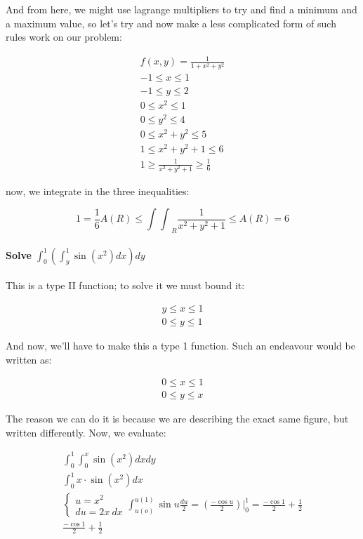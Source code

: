 \documentclass[11pt,fleqn]{book} %
\begin{document}
And from here, we might use lagrange multipliers to try and find a minimum and a maximum value, so let's try and now make a less complicated form of such rules work on our problem:

\begin{gather}
    f(x,y) = \frac{1}{1+x^2+y^2}\\
    -1 \leq x \leq 1 \\
    -1 \leq y \leq 2 \\
    0 \leq x^2 \leq 1 \\
    0 \leq y^2 \leq 4 \\
    0 \leq x^2 + y^2 \leq 5 \\
    1 \leq x^2 + y^2 + 1 \leq 6 \\
    1 \geq \frac{1}{x^2 + y^2 + 1} \geq \frac{1}{6}
\end{gather}

now, we integrate in the three inequalities:

\begin{equation}
    1 = \frac{1}{6} A(R) \leq {\int\int}_R \frac{1}{x^2+y^2+1} \leq A(R) = 6
\end{equation}

\paragraph*{Solve $\int_0^1(\int_y^1 \sin(x^2)dx)dy$}

This is a type II function; to solve it we must bound it:

\begin{gather}
    y \leq x \leq 1 \\
    0 \leq y \leq 1
\end{gather}

And now, we'll have to make this a type 1 function. Such an endeavour would be written as:

\begin{gather}
    0 \leq x \leq 1 \\
    0 \leq y \leq x
\end{gather}

The reason we can do it is because we are describing the exact same figure, but written differently. Now, we evaluate:

\begin{gather}
    \int_0^1 \int_0^x \sin(x^2) dx dy \\
    \int_0^1 x \cdot \sin(x^2) dx \\
    \begin{cases}
        u = x^2\\
        du = 2x \ dx
    \end{cases}
    \int_{u(o)}^{u(1)} \sin{u} \frac{du}{2} = (\frac{-\cos{u}}{2})|_0^1 = \frac{-\cos{1}}{2} + \frac{1}{2}\\
    \frac{-\cos{1}}{2} + \frac{1}{2}
\end{gather}
\end{document}
